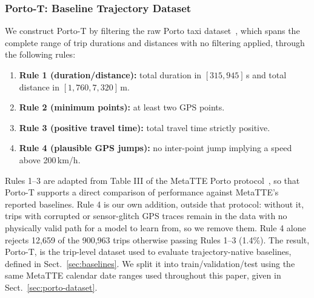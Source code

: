 \subsubsection{Porto-T: Baseline Trajectory Dataset}
We construct Porto-T by filtering the raw Porto taxi dataset~\cite{moreira2013porto}, which spans the complete range of trip durations and distances with no filtering applied, through the following rules:
\begin{enumerate}
    \item \textbf{Rule 1 (duration/distance):} total duration in $[315,945]$\,s and total distance in $[1{,}760,7{,}320]$\,m.
    \item \textbf{Rule 2 (minimum points):} at least two GPS points.
    \item \textbf{Rule 3 (positive travel time):} total travel time strictly positive.
    \item \textbf{Rule 4 (plausible GPS jumps):} no inter-point jump implying a speed above 200\,km/h.
\end{enumerate}
Rules 1--3 are adapted from Table III of the MetaTTE Porto protocol~\cite{wang2022metatte}, so that Porto-T supports a direct comparison of performance against MetaTTE's reported baselines. Rule 4 is our own addition, outside that protocol: without it, trips with corrupted or sensor-glitch GPS traces remain in the data with no physically valid path for a model to learn from, so we remove them. Rule 4 alone rejects 12,659 of the 900,963 trips otherwise passing Rules 1--3 (1.4\%). The result, Porto-T, is the trip-level dataset used to evaluate trajectory-native baselines, defined in Sect.~\ref{sec:baselines}. We split it into train/validation/test using the same MetaTTE calendar date ranges used throughout this paper, given in Sect.~\ref{sec:porto-dataset}.

